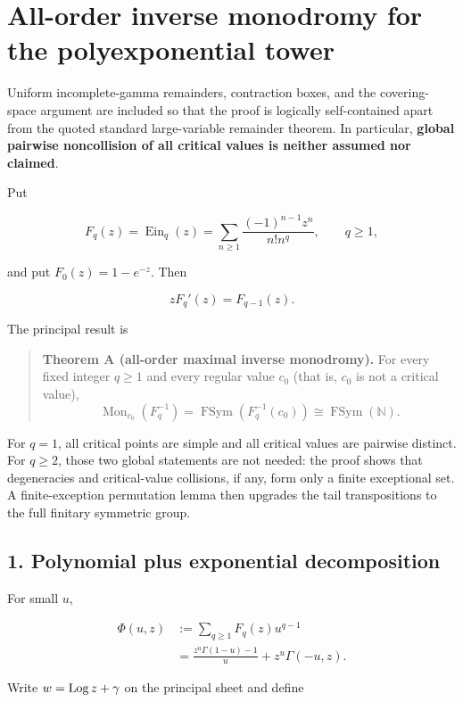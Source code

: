 \section{All-order inverse monodromy for the polyexponential tower}

Uniform incomplete-gamma remainders, contraction boxes, and the covering-space
argument are included so that the proof is logically self-contained apart from
the quoted standard large-variable remainder theorem.  In particular,
\textbf{global pairwise noncollision of all critical values is neither assumed
nor claimed}.

Put

\[
 F_q(z)=\operatorname{Ein}_q(z)
 =\sum_{n\geq1}\frac{(-1)^{n-1}z^n}{n!n^q},\qquad q\geq1,
\]

and put \(F_0(z)=1-e^{-z}\). Then

\[
 zF_q'(z)=F_{q-1}(z).
\tag{Inv-0.1}
\]

The principal result is

\begin{quote}
\textbf{Theorem A (all-order maximal inverse monodromy).} For every fixed
integer \(q\geq1\) and every regular value \(c_0\) (that is, \(c_0\) is
not a critical value),
\[
 \operatorname{Mon}_{c_0}(F_q^{-1})
 =\operatorname{FSym}(F_q^{-1}(c_0))
 \cong\operatorname{FSym}(\mathbb N).
\tag{Inv-0.2}
\]
\end{quote}

For \(q=1\), all critical points are simple and all critical values are
pairwise distinct. For \(q\geq2\), those two global statements are not
needed: the proof shows that degeneracies and critical-value collisions, if
any, form only a finite exceptional set. A finite-exception permutation
lemma then upgrades the tail transpositions to the full finitary symmetric
group.

\subsection{1. Polynomial plus exponential decomposition}

For small \(u\),

\[
 \begin{aligned}
 \Phi(u,z)
 &:=\sum_{q\geq1}F_q(z)u^{q-1}\\
 &=\frac{z^u\Gamma(1-u)-1}{u}+z^u\Gamma(-u,z).
 \end{aligned}
\tag{Inv-1.1}
\]

Write \(w=\operatorname{Log} z+\gamma\) on the principal sheet and define

